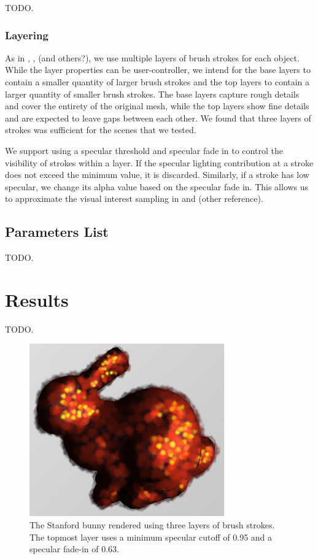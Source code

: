\documentclass[conference]{acmsiggraph}
\begin{document}
TODO.

\subsubsection{Layering}

As in \cite{Hertzmann:1998:PRC:280814.280951},
\cite{Meier:1996:PRA:237170.237288}, (and others?), we use multiple layers of
brush strokes for each object. While the layer properties can be
user-controller, we intend for the base layers to contain a smaller quantity of
larger brush strokes and the top layers to contain a larger quantity of smaller
brush strokes. The base layers capture rough details and cover the entirety of
the original mesh, while the top layers show fine details and are expected to
leave gaps between each other. We found that three layers of strokes was
sufficient for the scenes that we tested.

We support using a specular threshold and specular fade in to control the
visibility of strokes within a layer. If the specular lighting contribution at
a stroke does not exceed the minimum value, it is discarded. Similarly, if a
stroke has low specular, we change its alpha value based on the specular fade
in. This allows us to approximate the visual interest sampling in
\cite{Hertzmann:1998:PRC:280814.280951} and (other reference).


\subsection{Parameters List}

TODO.

\section{Results}

TODO.

\begin{figure}[ht]
  \centering
  \includegraphics[width=3.3in]{images/bunny_with_fade_in}
  \caption{The Stanford bunny rendered using three layers of brush strokes.
           The topmost layer uses a minimum specular cutoff of 0.95 and a
           specular fade-in of 0.63.}
\end{figure}
\end{document}
